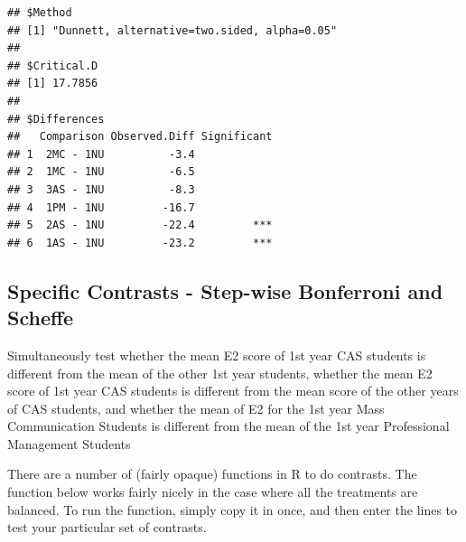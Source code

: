 \documentclass[
]{book}
\begin{document}
\begin{verbatim}
## $Method
## [1] "Dunnett, alternative=two.sided, alpha=0.05"
## 
## $Critical.D
## [1] 17.7856
## 
## $Differences
##   Comparison Observed.Diff Significant
## 1  2MC - 1NU          -3.4            
## 2  1MC - 1NU          -6.5            
## 3  3AS - 1NU          -8.3            
## 4  1PM - 1NU         -16.7            
## 5  2AS - 1NU         -22.4         ***
## 6  1AS - 1NU         -23.2         ***
\end{verbatim}

\hypertarget{specific-contrasts---step-wise-bonferroni-and-scheffe}{%
\subsection{Specific Contrasts - Step-wise Bonferroni and Scheffe}\label{specific-contrasts---step-wise-bonferroni-and-scheffe}}

Simultaneously test whether the mean E2 score of 1st year CAS students is different from the mean of the other 1st year students, whether the mean E2 score of 1st year CAS students is different from the mean score of the other years of CAS students, and whether the mean of E2 for the 1st year Mass Communication Students is different from the mean of the 1st year Professional Management Students

There are a number of (fairly opaque) functions in R to do contrasts. The function below works fairly nicely in the case where all the treatments are balanced. To run the function, simply copy it in once, and then enter the lines to test your particular set of contrasts.
\end{document}
